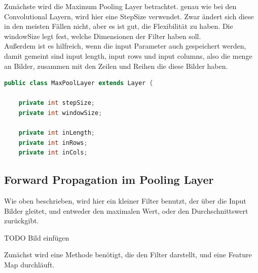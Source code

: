 \documentclass[12pt]{article}
\begin{document}
Zunächste wird die Maximum Pooling Layer betrachtet.
genau wie bei den Convolutional Layern, wird hier eine StepSize verwendet. Zwar ändert sich diese in den meisten Fällen nicht, aber es ist gut, die Flexibilität zu haben.
Die windowSize legt fest, welche Dimensionen der Filter haben soll.
\\Außerdem ist es hilfreich, wenn die input Parameter auch gespeichert werden, damit gemeint sind input length, input rows und input columns, also die menge an Bilder, zusammen mit den Zeilen und Reihen die diese Bilder haben.

\begin{lstlisting}[language=Java]
public class MaxPoolLayer extends Layer {

    private int stepSize;
    private int windowSize;

    private int inLength;
    private int inRows;
    private int inCols;
\end{lstlisting} 

\subsection{Forward Propagation im Pooling Layer}
Wie oben beschrieben, wird hier ein kleiner Filter benutzt, der über die Input Bilder gleitet, und entweder den maximalen Wert, oder den Durchschnittswert zurückgibt. 

TODO Bild einfügen

Zunächst wird eine Methode benötigt, die den Filter darstellt, und eine Feature Map durchläuft. 
\end{document}
